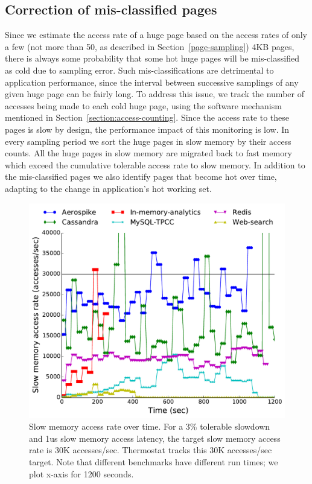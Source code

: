\subsection{Correction of mis-classified pages}
\label{classification-correction}
Since we estimate the access rate of a huge page based on the access rates
of only a few (not more than 50, as described in
Section~\ref{page-sampling}) 4KB pages, there is always some probability
that some hot huge pages will be mis-classified as cold due to sampling error. 
Such mis-classifications are detrimental to application
performance, since the interval between successive samplings of any given
huge page can be fairly long. To address this issue, we track the number of
accesses being made to each cold huge page, using the software
mechanism mentioned in Section~\ref{section:access-counting}.  Since the access
rate to these pages is slow by design, the performance impact of this monitoring is low.
In every sampling period we sort the huge pages in slow memory by their access
counts. All the huge pages in slow memory are migrated back to fast memory which
exceed the cumulative tolerable access rate to slow memory. In addition to the
mis-classified pages we also identify pages that become hot over time, adapting
to the change in application's hot working set.

\begin{figure}[t]
\centering
\includegraphics[width=1.0\columnwidth]{asplos2017/figures/faults.pdf}
\caption{Slow memory access rate over time. For a 3\% tolerable slowdown and 1us
slow memory access latency, the target slow memory access rate is 30K accesses/sec.
Thermostat tracks this 30K accesses/sec target. Note that different benchmarks
have different run times; we plot x-axis for 1200 seconds.} 
\label{fig:fault-rate}
\end{figure}

